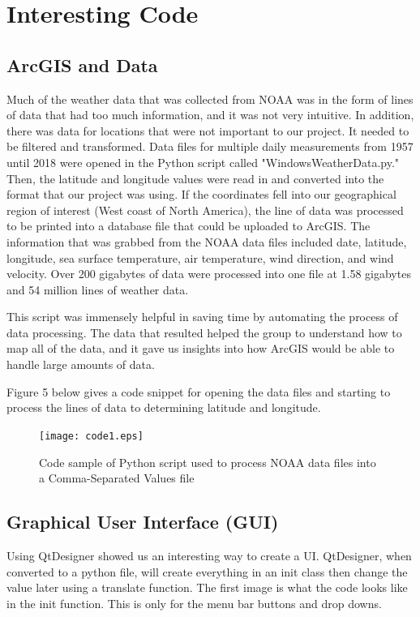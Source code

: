 \documentclass[onecolumn, draftclsnofoot,10pt, compsoc]{IEEEtran}
\begin{document}
\section{Interesting Code}
\subsection{ArcGIS and Data}
Much of the weather data that was collected from NOAA was in the form of lines of data that had too much information, and it was not very intuitive. In addition, there was data for locations that were not important to our project. It needed to be filtered and transformed.  Data files for multiple daily measurements from 1957 until 2018 were opened in the Python script called "WindowsWeatherData.py."  Then, the latitude and longitude values were read in and converted into the format that our project was using.  If the coordinates fell into our geographical region of interest (West coast of North America), the line of data was processed to be printed into a database file that could be uploaded to ArcGIS.  The information that was grabbed from the NOAA data files included date, latitude, longitude, sea surface temperature, air temperature, wind direction, and wind velocity.  Over 200 gigabytes of data were processed into one file at 1.58 gigabytes and 54 million lines of weather data.  

This script was immensely helpful in saving time by automating the process of data processing.  The data that resulted helped the group to understand how to map all of the data, and it gave us insights into how ArcGIS would be able to handle large amounts of data.

Figure 5 below gives a code snippet for opening the data files and starting to process the lines of data to determining latitude and longitude. 
\begin{figure}[H]
  \texttt{[image: code1.eps]}
  \caption{Code sample of Python script used to process NOAA data files into a Comma-Separated Values file}
\end{figure}

\subsection{Graphical User Interface (GUI)}
Using QtDesigner showed us an interesting way to create a UI. QtDesigner, when converted to a python file, will create everything in an init class then change the value later using a translate function. The first image is what the code looks like in the init function. This is only for the menu bar buttons and drop downs.
\end{document}
